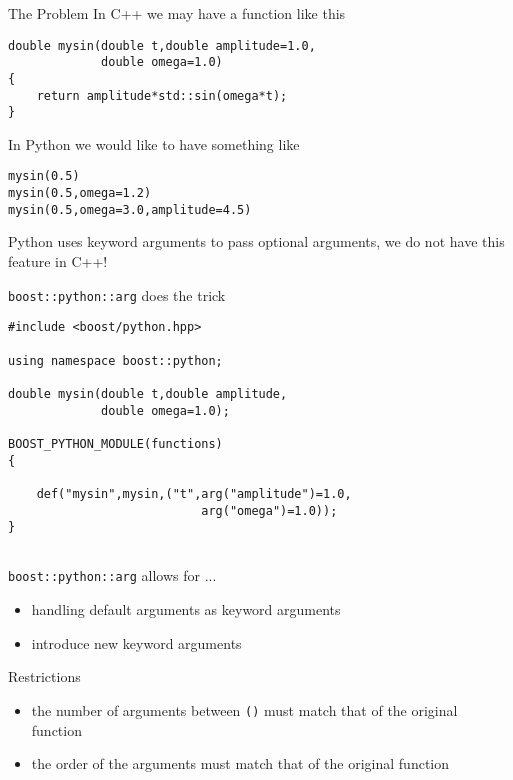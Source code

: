 
\begin{frame}[fragile]{The Problem}
    In C++ we may have a function like this 
    \begin{verbatim}
double mysin(double t,double amplitude=1.0,
             double omega=1.0)
{
    return amplitude*std::sin(omega*t);
}
    \end{verbatim}
    \vspace{0.05\textheight}
    In Python we would like to have something like 
    \begin{verbatim}
mysin(0.5)
mysin(0.5,omega=1.2)
mysin(0.5,omega=3.0,amplitude=4.5)
    \end{verbatim}
    \vspace{0.025\textheight}
    Python uses keyword arguments to pass optional arguments, we do not have
    this feature in C++!
\end{frame}

\begin{frame}[fragile]{\texttt{boost::python::arg} does the trick}
    \begin{verbatim}
#include <boost/python.hpp>

using namespace boost::python; 

double mysin(double t,double amplitude,
             double omega=1.0);

BOOST_PYTHON_MODULE(functions)
{

    def("mysin",mysin,("t",arg("amplitude")=1.0,
                           arg("omega")=1.0));
}


    \end{verbatim}
\end{frame}

\begin{frame}{\texttt{boost::python::arg} allows for ...}
    \begin{itemize}
        \item handling default arguments as keyword arguments
        \item introduce new keyword arguments
    \end{itemize}
    \vspace{0.1\textheight}
    Restrictions
    \begin{itemize}
        \item the number of arguments between \texttt{()} must match that of
            the original function
        \item the order of the arguments must match that of the original
            function
    \end{itemize}
\end{frame}
